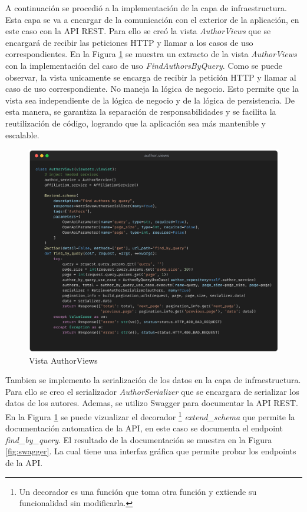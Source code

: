 A continuación se procedió a la implementación de la capa de infraestructura.
Esta capa se va a encargar de la comunicación con el exterior de la aplicación, en este caso con la API REST.
Para ello se creó la vista \textit{AuthorViews} que se encargará de recibir las peticiones HTTP y llamar a los casos de uso correspondientes.
En la Figura \ref{fig:author-views} se muestra un extracto de la vista \textit{AuthorViews} con la implementación del caso de uso \textit{FindAuthorsByQuery}.
Como se puede observar, la vista unicamente se encarga de recibir la petición HTTP y llamar al caso de uso correspondiente. No maneja la lógica de negocio.
Esto permite que la vista sea independiente de la lógica de negocio y de la lógica de persistencia. De esta manera, se garantiza la separación de responsabilidades y se facilita la reutilización de código, logrando que la aplicación sea más mantenible y escalable.
\begin{figure}[H]
    \centering
    \includegraphics[scale=0.085]{../02Figures/02Chapter/Sprints/Sprint-3/author-views.png}
    \caption{Vista AuthorViews}
    \label{fig:author-views}
\end{figure}

Tambien se implemento la serialización de los datos en la capa de infraestructura.
Para ello se creo el serializador \textit{AuthorSerializer} que se encargara de serializar los datos de los autores.
Ademas, se utilizo Swagger para documentar la API REST. En la Figura \ref{fig:author-views} se puede vizualizar el decorador \footnote{
    Un decorador es una función que toma otra función y extiende su funcionalidad sin modificarla.} \textit{extend\_schema} que permite la documentación automatica de la API, en este caso se documenta el endpoint \textit{find\_by\_query}.
El resultado de la documentación se muestra en la Figura \ref{fig:swagger}. La cual tiene una interfaz gráfica que permite probar los endpoints de la API.

